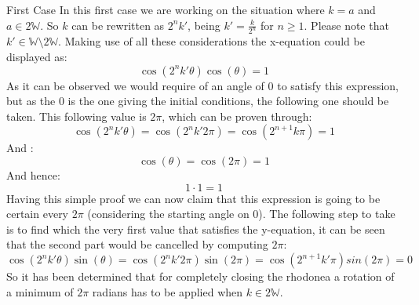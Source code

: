 \documentclass[12pt, a4paper]{article}
\begin{document}
\begin{section}{First Case}
In this first case we are working on the situation where $k = a$ and $a \in 2\mathbb{W}$. So $k$ can be rewritten as $2^{n}k'$, being $k' = \frac{k}{2^{n}}$ for $n\ge1$. Please note that $k'\in\mathbb{W}\setminus2\mathbb{W}$. Making use of all these considerations the x-equation could be displayed as:
\begin{equation}
 \cos(2^{n}k'\theta)\cos(\theta) = 1
\end{equation}
As it can be observed we would require of an angle of 0 to satisfy this expression, but as the 0 is the one giving the initial conditions, the following one should be taken. This following value is $2\pi$, which can be proven through:
\begin{equation*}
 \cos(2^nk'\theta) = \cos(2^n k' 2\pi) = \cos(2^{n+1}k\pi) = 1
\end{equation*}
And :
\begin{equation*}
 \cos(\theta) = \cos(2\pi) = 1
\end{equation*}
And hence:
\begin{equation*}
 1\cdot1 = 1
\end{equation*}
Having this simple proof we can now claim that this expression is going to be certain every $2\pi$ (considering the starting angle on 0). The following step to take is to find which the very first value that satisfies the y-equation, it can be seen that the second part would be cancelled by computing $2\pi$:
\begin{equation}
 \cos(2^{n}k'\theta)\sin(\theta) = \cos(2^{n}k'2\pi)\sin(2\pi) = \cos(2^{n+1}k'\pi)sin(2\pi) = 0
\end{equation}
So it has been determined that for completely closing the rhodonea a rotation of a minimum of $2\pi$ radians has to be applied when $k \in 2\mathbb{W}$.
\end{section}
\end{document}
